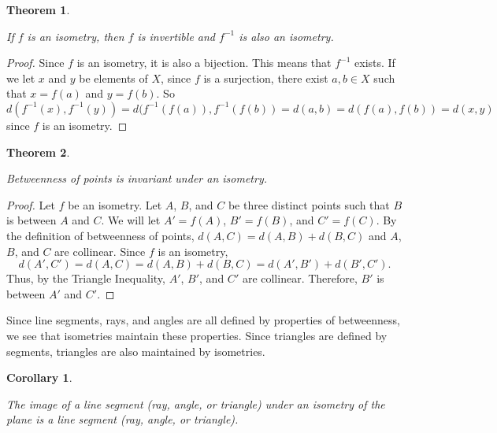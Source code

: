 \documentclass[
]{book}
\newtheorem{theorem}{Theorem}[chapter]
\newtheorem{corollary}{Corollary}[chapter]
\theoremstyle{definition}
\theoremstyle{definition}
\theoremstyle{definition}
\theoremstyle{definition}
\theoremstyle{remark}
\begin{document}
\begin{theorem}
\protect\hypertarget{thm:unlabeled-div-245}{}\label{thm:unlabeled-div-245}

If \(f\) is an isometry, then \(f\) is invertible and \(f^{-1}\) is also an isometry.

\end{theorem}

\begin{proof}

Since \(f\) is an isometry, it is also a bijection. This means that \(f^{-1}\) exists. If we let \(x\) and \(y\) be elements of \(X\), since \(f\) is a surjection, there exist \(a,b\in X\) such that \(x=f(a)\) and \(y=f(b)\). So
\[d(f^{-1}(x),f^{-1}(y)) = d(f^{-1}(f(a)),f^{-1}(f(b))= d(a,b) = d(f(a),f(b))=d(x,y)\] since \(f\) is an isometry.

\end{proof}

\begin{theorem}
\protect\hypertarget{thm:unlabeled-div-247}{}\label{thm:unlabeled-div-247}

Betweenness of points is invariant under an isometry.

\end{theorem}

\begin{proof}

Let \(f\) be an isometry. Let \(A\), \(B\), and \(C\) be three distinct points such that \(B\) is between \(A\) and \(C\). We will let \(A' = f(A)\), \(B' = f(B)\), and \(C' = f(C)\). By the definition of betweenness of points, \(d(A,C) = d(A,B) + d(B,C)\) and \(A\), \(B\), and \(C\) are collinear. Since \(f\) is an isometry, \[d(A',C') = d(A,C)= d(A,B) + d(B,C) = d(A',B') +d(B',C').\] Thus, by the Triangle Inequality, \(A'\), \(B'\), and \(C'\) are collinear. Therefore, \(B'\) is between \(A'\) and \(C'\).

\end{proof}

Since line segments, rays, and angles are all defined by properties of betweenness, we see that isometries maintain these properties. Since triangles are defined by segments, triangles are also maintained by isometries.

\begin{corollary}
\protect\hypertarget{cor:unlabeled-div-249}{}\label{cor:unlabeled-div-249}

The image of a line segment (ray, angle, or triangle) under an isometry of the plane is a line segment (ray, angle, or triangle).

\end{corollary}
\end{document}
